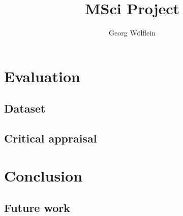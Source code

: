 \documentclass[a4paper,oneside]{book}
\author{Georg Wölflein}
\title{MSci Project}
\DeclareRobustCommand{\[}{\begin{equation}}
\DeclareRobustCommand{\]}{\end{equation}}
\DeclareRobustCommand{\(}{\begin{equation*}}
\DeclareRobustCommand{\)}{\end{equation*}}
\begin{document}
\frontmatter


\tableofcontents
\listoffigures
\listoftables


\mainmatter






\chapter{Evaluation}
\section{Dataset}
\section{Critical appraisal}
\chapter{Conclusion}
\section{Future work}

\printglossary[type=\acronymtype]
\printbibliography[heading=bibintoc]

\appendix


\end{document}

